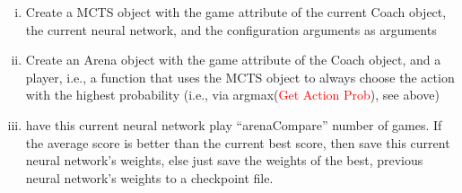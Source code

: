 \documentclass[12pt]{article}
\begin{document}
\begin{redenum}
\begin{enumerate}[A.)]
\begin{enumerate}[I.)]
\begin{enumerate}[i.)]
				\item Create a MCTS object with the game attribute of the current Coach object, the current neural network, and the configuration arguments as arguments
				\item Create an Arena object with the game attribute of the Coach object, and a player, i.e., a function that uses the MCTS object to always choose the action with the highest probability (i.e., via argmax(\textcolor{red}{Get Action Prob}), see above)
				\item have this current neural network play ``arenaCompare'' number of games. If the average score is better than the current best score, then save this current neural network's weights, else just save the weights of the best, previous neural network's weights to a checkpoint file.
			\end{enumerate}
		\end{enumerate}
	\end{enumerate}
\end{redenum}
\end{document}
